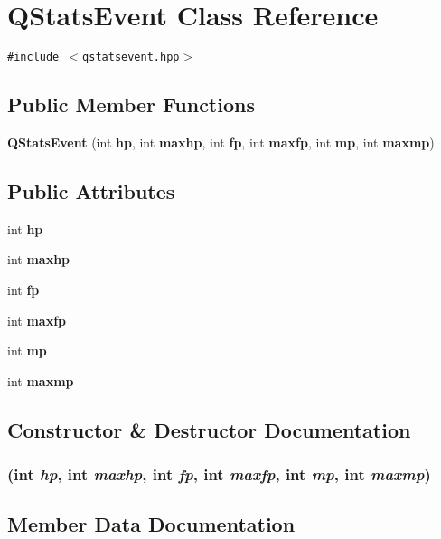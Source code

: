 \section{QStats\-Event Class Reference}
\label{classQStatsEvent}
{\tt \#include $<$qstatsevent.hpp$>$}

\subsection*{Public Member Functions}
\begin{CompactItemize}
\item 
{\bf QStats\-Event} (int {\bf hp}, int {\bf maxhp}, int {\bf fp}, int {\bf maxfp}, int {\bf mp}, int {\bf maxmp})
\end{CompactItemize}
\subsection*{Public Attributes}
\begin{CompactItemize}
\item 
int {\bf hp}
\item 
int {\bf maxhp}
\item 
int {\bf fp}
\item 
int {\bf maxfp}
\item 
int {\bf mp}
\item 
int {\bf maxmp}
\end{CompactItemize}


\subsection{Constructor \& Destructor Documentation}
\subsubsection{ (int {\em hp}, int {\em maxhp}, int {\em fp}, int {\em maxfp}, int {\em mp}, int {\em maxmp})}\label{classQStatsEvent_a0}




\subsection{Member Data Documentation}
